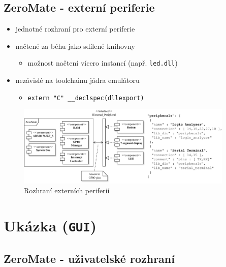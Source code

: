 \documentclass[compress]{beamer}
\begin{document}
\subsection{ZeroMate - externí periferie}

\begin{frame}
	
	\begin{itemize}
		\item jednotné rozhraní pro externí periferie
		\item načtené za běhu jako sdílené knihovny
		\begin{itemize}
			\item možnost načtení vícero instancí (např. \texttt{led.dll})
		\end{itemize}
		\item nezávislé na toolchainu jádra emulátoru
		\begin{itemize}
			\item \texttt{extern "C" \_\_declspec(dllexport)}
		\end{itemize}
	\end{itemize}
	\vspace{0.0cm}
	\begin{figure}
		\centering
		\hspace{0.4cm}
		\vspace{-0.4cm}
		\includegraphics[width=0.92\textwidth]{img/peripheral_interface_3.pdf}
		\caption{Rozhraní externích periferií}
	\end{figure}
\end{frame}

\section{Ukázka (\texttt{GUI})}

\subsection{ZeroMate - uživatelské rozhraní}
\end{document}
